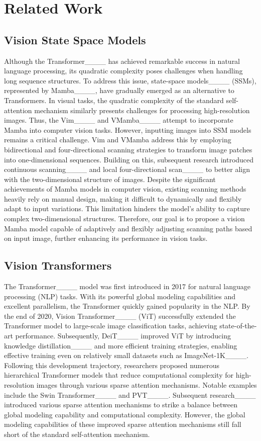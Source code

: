 \section{Related Work}
\subsection{Vision State Space Models}
Although the Transformer____ has achieved remarkable success in natural language processing, its quadratic complexity poses challenges when handling long sequence structures. To address this issue, state-space models____ (SSMs), represented by Mamba____, have gradually emerged as an alternative to Transformers. In visual tasks, the quadratic complexity of the standard self-attention mechanism similarly presents challenges for processing high-resolution images. Thus, the Vim____ and VMamba____ attempt to incorporate Mamba into computer vision tasks. However, inputting images into SSM models remains a critical challenge. Vim and VMamba address this by employing bidirectional and four-directional scanning strategies to transform image patches into one-dimensional sequences. Building on this, subsequent research introduced continuous scanning____ and local four-directional scan____ to better align with the two-dimensional structure of images. Despite the significant achievements of Mamba models in computer vision, existing scanning methods heavily rely on manual design, making it difficult to dynamically and flexibly adapt to input variations. This limitation hinders the model's ability to capture complex two-dimensional structures. Therefore, our goal is to propose a vision Mamba model capable of adaptively and flexibly adjusting scanning paths based on input image, further enhancing its performance in vision tasks.


\subsection{Vision Transformers}
The Transformer____ model was first introduced in 2017 for natural language processing (NLP) tasks. With its powerful global modeling capabilities and excellent parallelism, the Transformer quickly gained popularity in the NLP. By the end of 2020, Vision Transformer____ (ViT) successfully extended the Transformer model to large-scale image classification tasks, achieving state-of-the-art performance. Subsequently, DeiT____ improved ViT by introducing knowledge distillation____ and more efficient training strategies, enabling effective training even on relatively small datasets such as ImageNet-1K____. Following this development trajectory, researchers proposed numerous hierarchical Transformer models that reduce computational complexity for high-resolution images through various sparse attention mechanisms. Notable examples include the Swin Transformer____ and PVT____. Subsequent research____ introduced various sparse attention mechanisms to strike a balance between global modeling capability and computational complexity. However, the global modeling capabilities of these improved sparse attention mechanisms still fall short of the standard self-attention mechanism.


